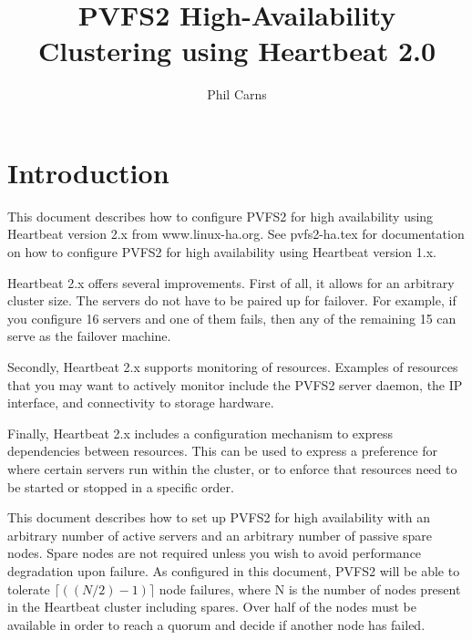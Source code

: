 \documentclass[11pt]{article}
\title{PVFS2 High-Availability Clustering using Heartbeat 2.0}
\author{Phil Carns}
\begin{document}
\maketitle

\begin{small}
\tableofcontents
\end{small}

\newpage


\section{Introduction}

This document describes how to configure PVFS2 for high availability
using Heartbeat version 2.x from www.linux-ha.org.  See pvfs2-ha.tex for
documentation on how to configure PVFS2 for high availability using
Heartbeat version 1.x.

Heartbeat 2.x offers several improvements.  First of all, it allows for
an arbitrary cluster size.  The servers do not have to be paired up for
failover.  For example, if you configure 16 servers and one of them
fails, then any of the remaining 15 can serve as the failover machine.

Secondly, Heartbeat 2.x supports monitoring of resources.  Examples of
resources that you may want to actively monitor include the PVFS2 server
daemon, the IP interface, and connectivity to storage hardware.

Finally, Heartbeat 2.x includes a configuration mechanism to express
dependencies between resources.  This can be used to
express a preference for where certain servers run within the cluster,
or to enforce that resources need to be started or stopped in a specific
order.

This document describes how to set up PVFS2 for high availability with
an arbitrary number of active servers and an arbitrary number of passive spare
nodes.  Spare nodes are not required unless you wish to avoid
performance degradation upon failure.  As configured in this document,
PVFS2 will be able to tolerate $\lceil ((N/2)-1) \rceil$ node failures,
where N is the number of nodes present in the Heartbeat cluster
including spares.  Over half of the nodes
must be available in order to reach a quorum and decide if another node has
failed.
\end{document}

